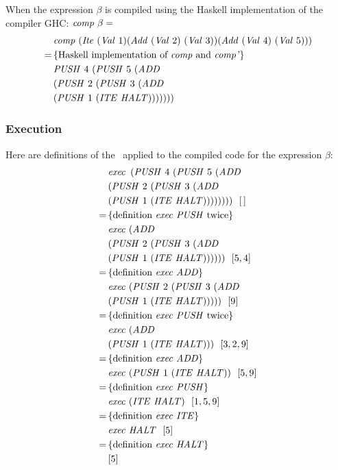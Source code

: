 \documentclass {article}
\begin{document}
When the expression $\beta$ is compiled
using the Haskell implementation of the compiler
GHC: \( \mathit{comp\ } \beta =\)
\begin{align*}
&\mathit{comp\ } (\mathit{Ite\ }
			(\mathit{Val\ } 1)
			(\mathit{Add\ } (\mathit{Val\ } 2)\ (\mathit{Val\ } 3))
			(\mathit{Add\ } (\mathit{Val\ } 4)\ (\mathit{Val\ } 5))) \\
=\, & \{ \mbox{Haskell implementation of \textit{comp}\ and \textit{comp'}} \} \\
&\mathit{PUSH\ } 4\ (\mathit{PUSH\ } 5\ (\mathit{ADD\ } \\
			&(\mathit{PUSH\ } 2\ (\mathit{PUSH\ } 3\ (\mathit{ADD\ } \\
			&(\mathit{PUSH\ } 1\ (\mathit{ITE\ } \mathit{HALT})))))))
\end{align*}
	
\subsubsection{Execution}

Here are definitions of the \vm\
applied to the compiled code for the expression $\beta$:
\begin{align*}
	&\mathit{exec\ } \, (\mathit{PUSH\ } 4\ (\mathit{PUSH\ } 5\ (\mathit{ADD\ } \\
			&(\mathit{PUSH\ } 2\ (\mathit{PUSH\ } 3\ (\mathit{ADD\ } \\
			&(\mathit{PUSH\ } 1\ (\mathit{ITE\ } \mathit{HALT}))))))))\ \ [\, ] \\
	=\, & \{ \mbox{definition \textit{exec}\ \textit{PUSH}\ twice} \} \\ 
	&\mathit{exec\ } (\mathit{ADD\ } \\
			&(\mathit{PUSH\ } 2\ (\mathit{PUSH\ } 3\ (\mathit{ADD\ } \\
			&(\mathit{PUSH\ } 1\ (\mathit{ITE\ } \mathit{HALT}))))))\ \ [5,4] \\
	=\, & \{ \mbox{definition \textit{exec}\ \textit{ADD}} \} \\
	&\mathit{exec\ } (\mathit{PUSH\ } 2\ (\mathit{PUSH\ } 3\ (\mathit{ADD\ } \\
			&(\mathit{PUSH\ } 1\ (\mathit{ITE\ } \mathit{HALT})))))\ \ [9] \\
	=\, & \{ \mbox{definition \textit{exec}\ \textit{PUSH}\ twice} \} \\ 
	&\mathit{exec\ } (\mathit{ADD\ } \\
			&(\mathit{PUSH\ } 1\ (\mathit{ITE\ } \mathit{HALT})))\ \ [3, 2, 9] \\
	=\, & \{ \mbox{definition \textit{exec}\ \textit{ADD}} \} \\
	&\mathit{exec\ } (\mathit{PUSH\ } 1\ (\mathit{ITE\ } \mathit{HALT}))\ \ [5, 9] \\
	=\, & \{ \mbox{definition \textit{exec}\ \textit{PUSH}} \} \\
	&\mathit{exec\ } (\mathit{ITE\ } \mathit{HALT})\ \ [1, 5, 9] \\
	=\, & \{ \mbox{definition \textit{exec}\ \textit{ITE}} \} \\
	&\mathit{exec\ } \mathit{HALT} \ \ [5] \\
	=\, & \{ \mbox{definition \textit{exec}\ \textit{HALT}} \} \\
	&[5]
\end{align*}
\end{document}
